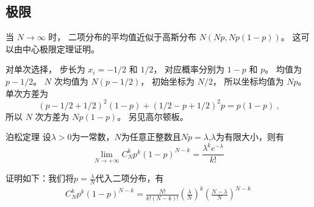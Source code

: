 \subsection{极限}
当 $N\to\infty$ 时， 二项分布的平均值近似于高斯分布 $N(Np, Np(1-p))$。 这可以由中心极限定理证明。


对单次选择， 步长为 $x_i = -1/2$ 和 $1/2$， 对应概率分别为 $1-p$ 和 $p$。 均值为 $p - 1/2$。 $N$ 次均值为 $N(p - 1/2)$， 初始坐标为 $N/2$， 所以坐标均值为 $Np$。 单次方差为
\begin{equation}
(p-1/2+1/2)^2(1-p) + (1/2 - p + 1/2)^2 p = p(1-p)~,
\end{equation}
所以 $N$ 次方差为 $Np(1-p)$。 另见高尔顿板。

\begin{theorem}{泊松定理}
设$\lambda>0$为一常数，$N$为任意正整数且$Np=\lambda$,$\lambda$为有限大小，则有
\begin{equation}
\lim_{N\to +\infty} C_N^k p^k(1-p)^{N-k} = \frac{\lambda^k e^{-\lambda}}{k!}~
\end{equation}
\end{theorem}
证明如下：我们将$p=\frac{\lambda}{N}$代入二项分布，有
\begin{align}
C_N^k p^k(1-p)^{N-k} = \frac{N!}{k! (N-k)!} (\frac{\lambda}{N})^k (\frac{N-\lambda}{N})^{N-k}~\\

\end{align}
